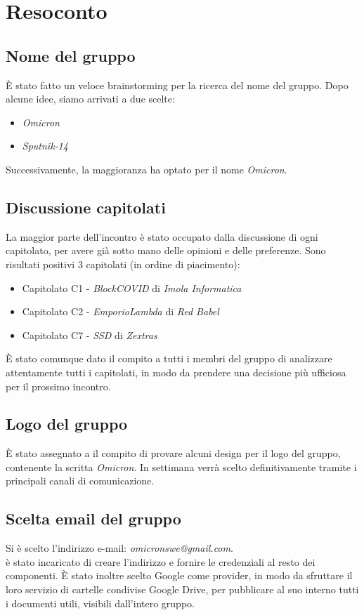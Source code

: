 \section{Resoconto}
	\subsection{Nome del gruppo}
	È stato fatto un veloce brainstorming per la ricerca del nome del gruppo. Dopo alcune idee, siamo arrivati a due scelte:
	\begin{itemize}
	\item \textit{Omicron}
	\item \textit{Sputnik-14}
	\end{itemize}
	Successivamente, la maggioranza ha optato per il nome \textit{Omicron}.
	
	\subsection{Discussione capitolati}
	La maggior parte dell'incontro è stato occupato dalla discussione di ogni capitolato, per avere già sotto mano delle opinioni e delle preferenze. Sono risultati positivi 3 capitolati (in ordine di piacimento):
	\begin{itemize}
		\item Capitolato C1 - \textit{BlockCOVID} di \textit{Imola Informatica}
		\item Capitolato C2 - \textit{EmporioLambda} di \textit{Red Babel}
		\item Capitolato C7 - \textit{SSD} di \textit{Zextras}
	\end{itemize}
	È stato comunque dato il compito a tutti i membri del gruppo di analizzare attentamente tutti i capitolati, in modo da prendere una decisione più ufficiosa per il prossimo incontro.
	
	\subsection{Logo del gruppo}
	È stato assegnato a \NM{} il compito di provare alcuni design per il logo del gruppo, contenente la scritta \textit{Omicron}. In settimana verrà scelto definitivamente tramite i principali canali di comunicazione.
	
	\subsection{Scelta email del gruppo}
	Si è scelto l'indirizzo e-mail: \textit{omicronswe@gmail.com}.\\
	\MDI{} è stato incaricato di creare l'indirizzo e fornire le credenziali al resto dei componenti. È stato inoltre scelto Google come provider, in modo da sfruttare il loro servizio di cartelle condivise Google Drive, per pubblicare al suo interno tutti i documenti utili, visibili dall'intero gruppo.
	
